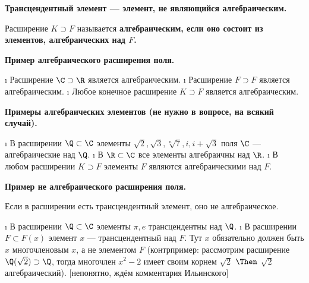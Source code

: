 \begin{defn}
\bf{Трансцендентный элемент} --- элемент, не являющийся алгебраическим.
\end{defn}

\begin{defn}
Расширение \(K \supset F\) называется \bf{алгебраическим}, если оно состоит из элементов, алгебраических над \(F\).
\end{defn}

\begin{defn}
\bf{Пример алгебраического расширения поля.}

\begin{itemize}
\tightlist
\i
  Расширение \(\C \supset \R\) является алгебраическим.
\i
  Расширение \(F \supset F\) является алгебраическим.
\i
  Любое конечное расширение \(K \supset F\) является алгебраическим.
\end{itemize}

\bf{Примеры алгебраических элементов (не нужно в вопросе, на всякий случай).}

\begin{itemize}
\tightlist
\i
  В расширении \(\Q \subset \C\) элементы \(\sqrt{2}, \sqrt{3}, \sqrt[n]{7}, i, i+\sqrt{3}\) поля \(\C\) --- алгебраические над \(\Q\).
\i
  В \(\R \subset \C\) все элементы алгебраичны над \(\R\).
\i
  В любом расширении \(K \supset F\) элементы \(F\) являются алгебраическими над \(F\).
\end{itemize}

\end{defn}

\begin{defn}
\bf{Пример не алгебраического расширения поля.}

Если в расширении есть трансцендентный элемент, оно не алгебраическое.

\begin{itemize}
\tightlist
\i
  В расширении \(\Q \subset \C\) элементы \(\pi, e\) трансцендентны над \(\Q\).
\i
  В расширении \(F \subset F(x)\) элемент \(x\) --- трансцендентный над \(F\). Тут \(x\) обязательно должен быть \(x\) многочленовым \(x\), а не элементом \(F\) (контрпример: рассмотрим расширение \(\Q(\sqrt{2}) \supset \Q\), тогда многочлен \(x^2-2\) имеет своим корнем \(\sqrt{2}\) \(\Then\) \(\sqrt{2}\) алгебраический). {[}непонятно, ждём комментария Ильинского{]}
\end{itemize}

\end{defn}

